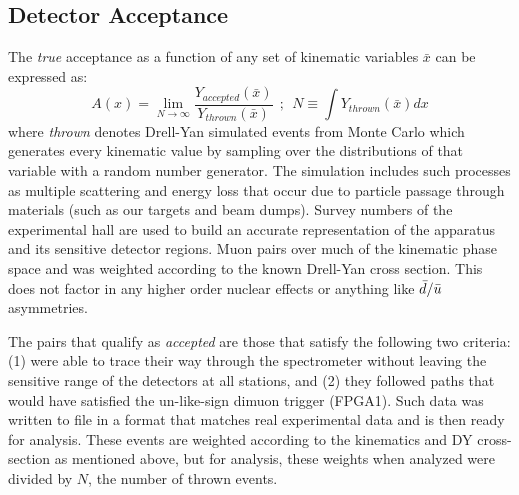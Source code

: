 \subsection{Detector Acceptance}

The \emph{true} acceptance as a function of any set of kinematic variables $\bar{x}$ can be expressed as:
\begin{equation}
A(x) = \lim\limits_{N\rightarrow \infty} \frac{Y_{accepted}(\bar{x})}{Y_{thrown} (\bar{x})}\ \ ;\ \ 
N \equiv \int Y_{thrown}(\bar{x}) dx
\end{equation}
where \emph{thrown} denotes Drell-Yan simulated events from Monte Carlo which generates every kinematic value by sampling over the distributions of that variable with a random number generator. The simulation includes such processes as multiple scattering and energy loss that occur due to particle passage through materials (such as our targets and beam dumps). Survey numbers of the experimental hall are used to build an accurate representation of the apparatus and its sensitive detector regions. Muon pairs over much of the kinematic phase space and was weighted according to the known Drell-Yan cross section. This does not factor in any higher order nuclear effects or anything like $\bar{d}/\bar{u}$ asymmetries. 

The pairs that qualify as \emph{accepted} are those that satisfy the following two criteria: (1) were able to trace their way through the spectrometer without leaving the sensitive range of the detectors at all stations, and (2) they followed paths that would have satisfied the un-like-sign dimuon trigger (FPGA1). Such data was written to file in a format that matches real experimental data and is then ready for analysis. These events are weighted according to the kinematics and DY cross-section as mentioned above, but for analysis, these weights when analyzed were divided by $N$, the number of thrown events.

